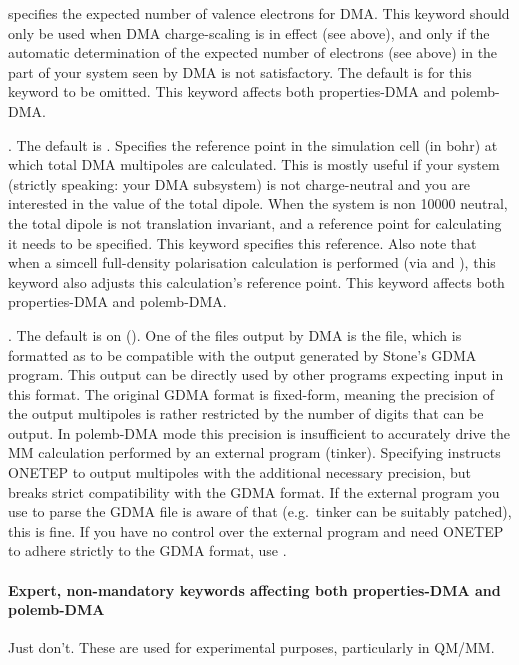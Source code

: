 \documentclass[letterpaper,10pt,english]{sphinxmanual}
\begin{document}
 \textendash{} specifies the expected number of
valence electrons for DMA. This keyword should only be used when DMA
charge-scaling is in effect (see above), and only if the automatic
determination of the expected number of electrons (see above) in the
part of your system seen by DMA is not satisfactory. The default is for
this keyword to be omitted. This keyword affects both properties-DMA and
polemb-DMA.

. The default is
. Specifies the reference point in the simulation cell
(in bohr) at which total DMA multipoles are calculated. This is mostly
useful if your system (strictly speaking: your DMA subsystem) is not
charge-neutral and you are interested in the value of the total dipole.
When the system is non 10000 neutral, the total dipole is not
translation invariant, and a reference point for calculating it needs to
be specified. This keyword specifies this reference. Also note that when
a simcell full-density polarisation calculation is performed (via
 and ), this
keyword also adjusts this calculation’s reference point. This keyword
affects both properties-DMA and polemb-DMA.

. The default is on (). One of
the files output by DMA is the  file,
which is formatted as to be compatible with the output generated by
Stone’s GDMA program. This output can be directly used by other programs
expecting input in this format. The original GDMA format is fixed-form,
meaning the precision of the output multipoles is rather restricted by
the number of digits that can be output. In polemb-DMA mode this
precision is insufficient to accurately drive the MM calculation
performed by an external program (tinker). Specifying
 instructs ONETEP to output multipoles with
the additional necessary precision, but breaks strict compatibility with
the GDMA format. If the external program you use to parse the GDMA file
is aware of that (e.g. tinker can be suitably patched), this is fine. If
you have no control over the external program and need ONETEP to adhere
strictly to the GDMA format, use .


\paragraph{Expert, non-mandatory keywords affecting both properties-DMA and polemb-DMA}
\label{\detokenize{hfx:expert-non-mandatory-keywords-affecting-both-properties-dma-and-polemb-dma}}
Just don’t. These are used for experimental purposes, particularly in
QM/MM.
\end{document}
